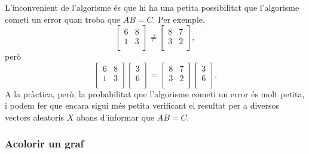 L'inconvenient de l'algorisme és que hi ha una petita possibilitat que
l'algorisme cometi un error quan troba que $AB=C$. Per exemple,
\[
 \begin{bmatrix}
  6 & 8 \\
  1 & 3 \\
 \end{bmatrix}
\neq
 \begin{bmatrix}
  8 & 7 \\
  3 & 2 \\
 \end{bmatrix},
\]
però
\[
 \begin{bmatrix}
  6 & 8 \\
  1 & 3 \\
 \end{bmatrix}
 \begin{bmatrix}
  3 \\
  6 \\
 \end{bmatrix}
=
 \begin{bmatrix}
  8 & 7 \\
  3 & 2 \\
 \end{bmatrix}
 \begin{bmatrix}
  3 \\
  6 \\
 \end{bmatrix}.
\]
A la pràctica, però, la probabilitat que l'algorisme cometi un error
és molt petita, i podem fer que encara sigui més petita verificant el
resultat per a diversos vectors aleatoris $X$ abans d'informar que
$AB=C$.

\subsubsection{Acolorir un graf}


